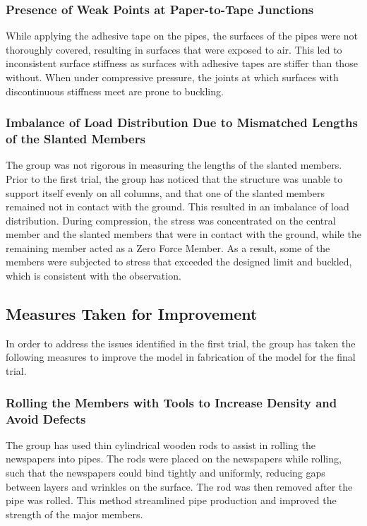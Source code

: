 \documentclass[fleqn,10pt]{SelfArx} %
\begin{document}
\subsubsection{Presence of Weak Points at Paper-to-Tape Junctions}

While applying the adhesive tape on the pipes, the surfaces of the pipes were not
	thoroughly covered, resulting in surfaces that were exposed to air. This led to
	inconsistent surface stiffness as surfaces with adhesive tapes are stiffer than
	those without. When under compressive pressure, the joints at which surfaces with
	discontinuous stiffness meet are prone to buckling.

\subsubsection{Imbalance of Load Distribution Due to Mismatched Lengths of the Slanted Members}

The group was not rigorous in measuring the lengths of the slanted members. Prior to the
	first trial, the group has noticed that the structure was unable to support itself
	evenly on all columns, and that one of the slanted members remained not in contact with
	the ground. This resulted in an imbalance of load distribution. During compression,
	the stress was concentrated on the central member and the slanted members that were in
	contact with the ground, while the remaining member acted as a Zero Force Member.
	As a result, some of the members were subjected to stress that exceeded the designed
	limit and buckled, which is consistent with the observation.

\subsection{Measures Taken for Improvement}

In order to address the issues identified in the first trial, the group has taken
	the following measures to improve the model in fabrication of the model for the
	final trial.

\subsubsection{Rolling the Members with Tools to Increase Density and Avoid Defects}

The group has used thin cylindrical wooden rods to assist in rolling the newspapers into
	pipes. The rods were placed on the newspapers while rolling, such that the newspapers
	could bind tightly and uniformly, reducing gaps between layers and wrinkles on the surface.
	The rod was then removed after the pipe was rolled. This method streamlined pipe
	production and improved the strength of the major members.
\end{document}
